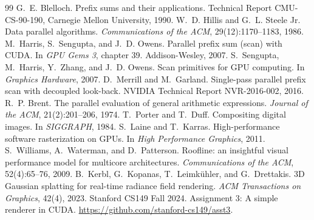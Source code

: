 \documentclass[11pt,a4paper]{ctexart}
\begin{document}
\begin{thebibliography}{99}
 G.~E. Blelloch. Prefix sums and their applications. Technical Report CMU-CS-90-190, Carnegie Mellon University, 1990.
 W.~D. Hillis and G.~L. Steele Jr. Data parallel algorithms. \emph{Communications of the ACM}, 29(12):1170--1183, 1986.
 M.~Harris, S.~Sengupta, and J.~D. Owens. Parallel prefix sum (scan) with CUDA. In \emph{GPU Gems 3}, chapter 39. Addison-Wesley, 2007.
 S.~Sengupta, M.~Harris, Y.~Zhang, and J.~D. Owens. Scan primitives for GPU computing. In \emph{Graphics Hardware}, 2007.
 D.~Merrill and M.~Garland. Single-pass parallel prefix scan with decoupled look-back. NVIDIA Technical Report NVR-2016-002, 2016.
 R.~P. Brent. The parallel evaluation of general arithmetic expressions. \emph{Journal of the ACM}, 21(2):201--206, 1974.
 T.~Porter and T.~Duff. Compositing digital images. In \emph{SIGGRAPH}, 1984.
 S.~Laine and T.~Karras. High-performance software rasterization on GPUs. In \emph{High Performance Graphics}, 2011.
 S.~Williams, A.~Waterman, and D.~Patterson. Roofline: an insightful visual performance model for multicore architectures. \emph{Communications of the ACM}, 52(4):65--76, 2009.
 B.~Kerbl, G.~Kopanas, T.~Leimk\"uhler, and G.~Drettakis. 3D Gaussian splatting for real-time radiance field rendering. \emph{ACM Transactions on Graphics}, 42(4), 2023.
 Stanford CS149 Fall 2024. Assignment 3: A simple renderer in CUDA. \url{https://github.com/stanford-cs149/asst3}.
\end{thebibliography}
\end{document}
